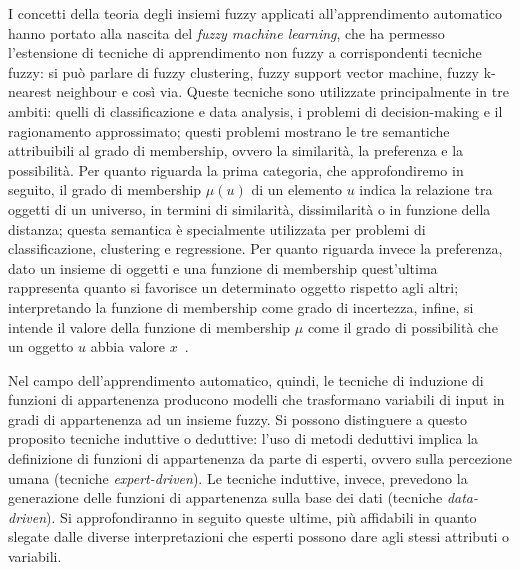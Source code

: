 \documentclass[oneside, openany]{book}
\begin{document}
		I concetti della teoria degli insiemi fuzzy applicati all'apprendimento automatico hanno portato alla nascita del \textit{fuzzy machine learning}, che ha permesso l'estensione di tecniche di apprendimento non fuzzy a corrispondenti tecniche fuzzy: si può parlare di fuzzy clustering, fuzzy support vector machine, fuzzy k-nearest neighbour e così via. Queste tecniche sono utilizzate principalmente in tre ambiti: quelli di classificazione e data analysis, i problemi di decision-making e il ragionamento approssimato; questi problemi mostrano le tre semantiche attribuibili al grado di membership, ovvero la similarità, la preferenza e la possibilità.\newline
		Per quanto riguarda la prima categoria, che approfondiremo in seguito, il grado di membership $\mu(u)$ di un elemento $u$  indica la relazione tra oggetti di un universo, in termini di similarità, dissimilarità o in funzione della distanza; questa semantica è specialmente utilizzata per problemi di classificazione, clustering e regressione. Per quanto riguarda invece la preferenza, dato un insieme di oggetti e una funzione di membership quest'ultima rappresenta quanto si favorisce un determinato oggetto rispetto agli altri; interpretando la funzione di membership come grado di incertezza, infine, si intende il valore della funzione di membership $\mu$ come il grado di possibilità che un oggetto $u$ abbia valore $x$~\cite{bib:dubois}.
		
		Nel campo dell'apprendimento automatico, quindi, le tecniche di induzione di funzioni di appartenenza producono modelli che trasformano variabili di input in gradi di appartenenza ad un insieme fuzzy. Si possono distinguere a questo proposito tecniche induttive o deduttive: l'uso di metodi deduttivi implica la definizione di funzioni di appartenenza da parte di esperti, ovvero sulla percezione umana (tecniche \textit{expert-driven}). Le tecniche induttive, invece, prevedono la generazione delle funzioni di appartenenza sulla base dei dati (tecniche \textit{data-driven}). Si approfondiranno in seguito queste ultime, più affidabili in quanto slegate dalle diverse interpretazioni che esperti possono dare agli stessi attributi o variabili.
	
\end{document}
